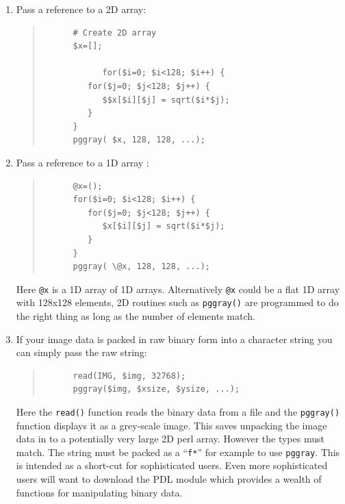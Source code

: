 \documentclass[twoside,11pt]{article}
\begin{document}
\begin{enumerate}
\item Pass a reference to a 2D array: 
   \small
   \begin{quote}
   \begin{verbatim}
      # Create 2D array
      $x=[];

            for($i=0; $i<128; $i++) { 
         for($j=0; $j<128; $j++) {
            $$x[$i][$j] = sqrt($i*$j); 
         }
      }
      pggray( $x, 128, 128, ...);
   \end{verbatim}
   \end{quote}
   \normalsize


\item Pass a reference to a 1D array :
   \small
   \begin{quote}
   \begin{verbatim}
      @x=();
      for($i=0; $i<128; $i++) { 
         for($j=0; $j<128; $j++) {
            $x[$i][$j] = sqrt($i*$j); 
         }
      }
      pggray( \@x, 128, 128, ...);
   \end{verbatim}
   \end{quote}
   \normalsize

Here {\tt @x} is a 1D array of 1D arrays.  Alternatively {\tt @x}
could be a flat 1D array with 128x128 elements, 2D routines such as
{\tt pggray()} are programmed to do the right thing as long as the
number of elements match. 

\item If your image data is packed in raw binary form into a character
string you can simply pass the raw string:

   \small
   \begin{quote}
   \begin{verbatim}
      read(IMG, $img, 32768); 
      pggray($img, $xsize, $ysize, ...);
   \end{verbatim}
   \end{quote}
   \normalsize

   Here the {\tt read()} function reads the binary data from a file
   and the {\tt pggray()} function displays it as a grey-scale image.
   This saves unpacking the image data in to a potentially very large
   2D perl array. However the types must match. The string must be
   packed as a ``{\tt f*}'' for example to use {\tt pggray}. This is
   intended as a short-cut for sophisticated users. Even more
   sophisticated users will want to download the PDL module which
   provides a wealth of functions for manipulating binary data. 

\end{enumerate}
\end{document}

